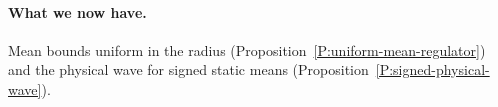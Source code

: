 \paragraph{What we now have.}
Mean bounds uniform in the radius (Proposition~\ref{P:uniform-mean-regulator})
and the physical wave for signed static means
(Proposition~\ref{P:signed-physical-wave}).
